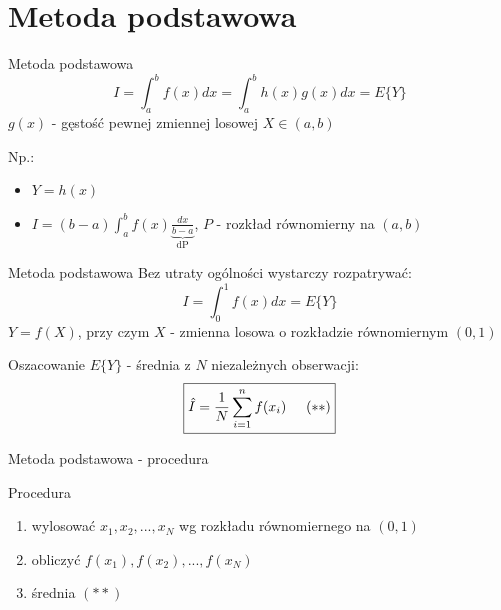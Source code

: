 \section{Metoda podstawowa}
\begin{frame}{Metoda podstawowa}
	\[
    	I = \int_a^b f(x) dx = \int_a^b h(x)g(x) dx = E\{Y\}
    \]
    $g(x)$ - gęstość pewnej zmiennej losowej $X \in (a, b)$
    
    Np.:
    \begin{itemize}
    	\item $Y = h(x)$
        \item $I = (b-a) \int_a^b f(x) \underbrace{\frac{dx}{b-a}}_\text{dP}$, $P$ - rozkład równomierny na $(a, b)$
    \end{itemize}
    
\end{frame}
\begin{frame}{Metoda podstawowa}
    Bez utraty ogólności wystarczy rozpatrywać: \[
    	I = \int_0^1 f(x) dx = E\{Y\}
    \]
    $Y = f(X)$, przy czym $X$ - zmienna losowa o rozkładzie równomiernym $(0, 1)$
    
    Oszacowanie $E\{Y\}$ - średnia z $N$ niezależnych obserwacji: \[
    	\boxed{
        \hat{I} = \frac{1}{N} \sum_{i=1}^n f(x_i) \hspace{.5cm} (**)
        }
    \]
\end{frame}
\begin{frame}{Metoda podstawowa - procedura}
    \begin{block}{Procedura}
        \begin{enumerate}
            \item wylosować $x_1, x_2, ..., x_N$ wg rozkładu równomiernego na $(0, 1)$
            \item obliczyć $f(x_1), f(x_2), ..., f(x_N)$
            \item średnia $(**)$
        \end{enumerate}
    \end{block}
\end{frame}
